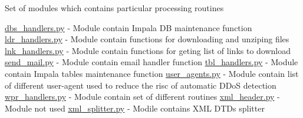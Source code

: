 Set of modules which contains particular processing routines

\mbox{\hyperlink{dbs__handlers_8py}{dbs\+\_\+handlers.\+py}} -\/ Module contain Impala DB maintenance function \mbox{\hyperlink{ldr__handlers_8py}{ldr\+\_\+handlers.\+py}} -\/ Module contain functions for downloading and unziping files \mbox{\hyperlink{lnk__handlers_8py}{lnk\+\_\+handlers.\+py}} -\/ Module contain functions for geting list of links to download \mbox{\hyperlink{send__mail_8py}{send\+\_\+mail.\+py}} -\/ Module contain email handler function \mbox{\hyperlink{tbl__handlers_8py}{tbl\+\_\+handlers.\+py}} -\/ Module contain Impala tables maintenance function \mbox{\hyperlink{user__agents_8py}{user\+\_\+agents.\+py}} -\/ Module contain list of different user-\/agent used to reduce the risc of automatic D\+DoS detection \mbox{\hyperlink{wpr__handlers_8py}{wpr\+\_\+handlers.\+py}} -\/ Module contain set of different routines \mbox{\hyperlink{xml__header_8py}{xml\+\_\+header.\+py}} -\/ Module not used \mbox{\hyperlink{xml__splitter_8py}{xml\+\_\+splitter.\+py}} -\/ Modile contains X\+ML D\+T\+Ds splitter 